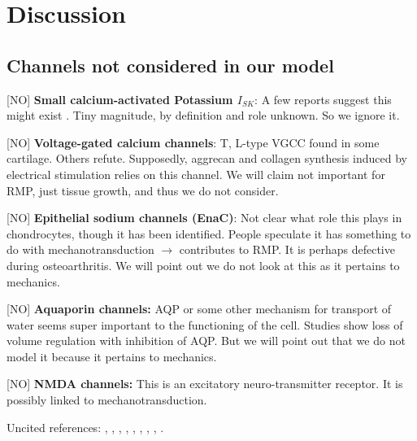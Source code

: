 \section{Discussion}
\label{sec:discussion}



\subsection{Channels not considered in our model}
\label{sec:channels-ignored}

[NO] {\bf Small calcium-activated Potassium $I_{SK}$}: A few reports
suggest this might exist \citep{Halletal1996,
  BarrettJolleyetal2010}. Tiny magnitude, by definition and role
unknown. So we ignore it.

[NO] {\bf Voltage-gated calcium channels}: T, L-type VGCC found in
some cartilage. Others refute. Supposedly, aggrecan and collagen
synthesis induced by electrical stimulation relies on this channel. We
will claim not important for RMP, just tissue growth, and thus we do
not consider.

[NO] {\bf Epithelial sodium channels (EnaC)}: Not clear what role this
plays in chondrocytes, though it has been identified. People speculate
it has something to do with mechanotransduction $\rightarrow$
contributes to RMP. It is perhaps defective during osteoarthritis. We
will point out we do not look at this as it pertains to mechanics.

[NO] {\bf Aquaporin channels:} AQP or some other mechanism for
transport of water seems super important to the functioning of the
cell. Studies show loss of volume regulation with inhibition of
AQP. But we will point out that we do not model it because it pertains
to mechanics.

[NO] {\bf NMDA channels:} This is an excitatory neuro-transmitter
receptor. It is possibly linked to mechanotransduction.


Uncited references:
\cite{ArcherWest2003},
\cite{Grishkoetal2010},
\cite{Hille2001},
\cite{LesageLazdunski2000},
\cite{MillwardSadleretal2000},
\cite{Nygrenetal1998},
\cite{RadhakrishnanHindmarsh1993},
\cite{Scholz2002},
\cite{Tsugaetal2001}.

